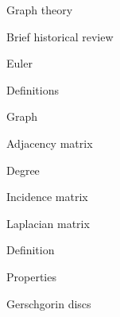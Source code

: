 
\def\ctustyle{{\tenss CTUstyle}}
\def\ttb{\tt\char`\\} %


\chap Graph theory




\sec Brief historical review

Euler




\sec Definitions

Graph

Adjacency matrix

Degree

Incidence matrix



\sec Laplacian matrix 

Definition

Properties

Gerschgorin discs



